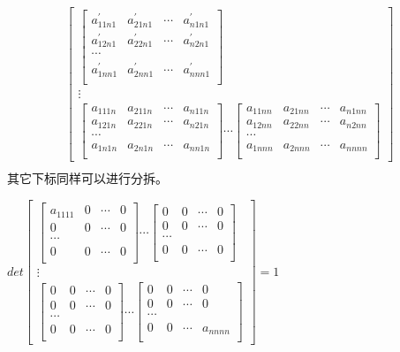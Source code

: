\documentclass[twoside,a4paper,CCT]{cctart}   %
\begin{document}
\begin{list}{}
\begin{align*}
\begin{bmatrix}
\begin{bmatrix}
  a_{11n1}^{'}& a_{21n1}^{'}&\cdots&a_{n1n1}^{'}\\
  a_{12n1}^{'}& a_{22n1}^{'}&\cdots&a_{n2n1}^{'}\\
 \cdots\\
 a_{1nn1}^{'}& a_{2nn1}^{'}&\cdots&a_{nnn1}^{'}\\
 \end{bmatrix}\\
\vdots\\
\begin{bmatrix}
  a_{111n}& a_{211n}&\cdots&a_{n11n}\\
  a_{121n}& a_{221n}&\cdots&a_{n21n}\\
   \cdots\\
   a_{1n1n}& a_{2n1n}&\cdots&a_{nn1n}\\
   \end{bmatrix}
\cdots
\begin{bmatrix}
  a_{11nn}& a_{21nn}&\cdots&a_{n1nn}\\
  a_{12nn}& a_{22nn}&\cdots&a_{n2nn}\\
   \cdots\\
   a_{1nnn}& a_{2nnn}&\cdots&a_{nnnn}\\
   \end{bmatrix}
    \end{bmatrix}\\
    \end{align*}
   其它下标同样可以进行分拆。
   \item
$det \begin{bmatrix}
 \begin{bmatrix}
   a_{1111}& 0&\cdots&0\\
   0& 0&\cdots&0\\
 \cdots\\
0& 0&\cdots&0\\
\end{bmatrix}
\cdots
\begin{bmatrix}
  0& 0&\cdots&0\\
  0& 0&\cdots&0\\
 \cdots\\
 0& 0&\cdots&0\\
 \end{bmatrix}\\
\vdots\\
\begin{bmatrix}
  0& 0&\cdots&0\\
  0& 0&\cdots&0\\
   \cdots\\
   0& 0&\cdots&0\\
   \end{bmatrix}
\cdots
\begin{bmatrix}
  0& 0&\cdots&0\\
  0& 0&\cdots&0\\
   \cdots\\
   0& 0&\cdots&a_{nnnn}\\
   \end{bmatrix}
    \end{bmatrix}
    =1$
 \end{list}
\end{document}
